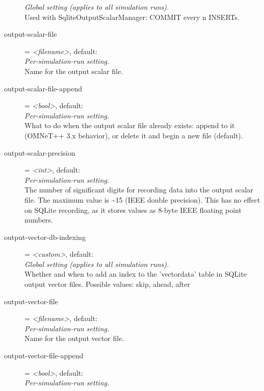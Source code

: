 \begin{description}
    \textit{Global setting (applies to all simulation runs).}\\
    Used with SqliteOutputScalarManager: COMMIT every n INSERTs.
\item[output-scalar-file] = \textit{<filename>}, default: \\
    \textit{Per-simulation-run setting.}\\
    Name for the output scalar file.
\item[output-scalar-file-append] = \textit{<bool>}, default: \\
    \textit{Per-simulation-run setting.}\\
    What to do when the output scalar file already exists: append to it
    (OMNeT++ 3.x behavior), or delete it and begin a new file (default).
\item[output-scalar-precision] = \textit{<int>}, default: \\
    \textit{Per-simulation-run setting.}\\
    The number of significant digits for recording data into the output scalar
    file. The maximum value is {\textasciitilde}15 (IEEE double precision).
    This has no effect on SQLite recording, as it stores values as 8-byte IEEE
    floating point numbers.
\item[output-vector-db-indexing] = \textit{<custom>}, default: \\
    \textit{Global setting (applies to all simulation runs).}\\
    Whether and when to add an index to the 'vectordata' table in SQLite output
    vector files. Possible values: skip, ahead, after
\item[output-vector-file] = \textit{<filename>}, default: \\
    \textit{Per-simulation-run setting.}\\
    Name for the output vector file.
\item[output-vector-file-append] = \textit{<bool>}, default: \\
    \textit{Per-simulation-run setting.}\\

\end{description}
